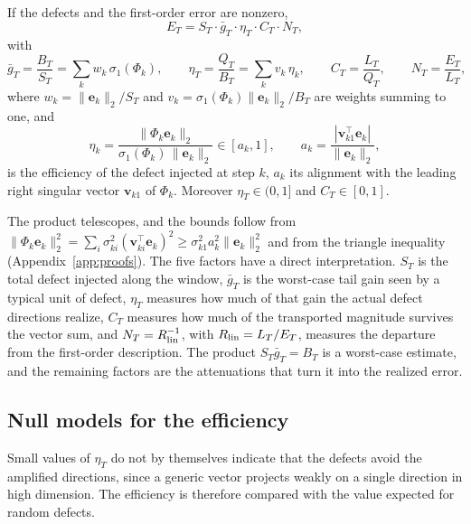 \begin{proposition}
\label{prop:factorization}
If the defects and the first-order error are nonzero,
\begin{equation}
  \boxed{\;E_T=S_T\cdot\bar g_T\cdot\eta_T\cdot C_T\cdot N_T,\;}
  \label{eq:factorization}
\end{equation}
with
\begin{equation}
  \bar g_T=\frac{B_T}{S_T}=\sum_k w_k\,\sigma_1(\Phi_k),
  \qquad
  \eta_T=\frac{Q_T}{B_T}=\sum_k v_k\,\eta_k,
  \qquad
  C_T=\frac{L_T}{Q_T},
  \qquad
  N_T=\frac{E_T}{L_T},
  \label{eq:factors}
\end{equation}
where $w_k=\|\mathbf e_k\|_2/S_T$ and $v_k=\sigma_1(\Phi_k)\|\mathbf e_k\|_2/B_T$ are weights summing to one, and
\begin{equation}
  \eta_k=\frac{\|\Phi_k\mathbf e_k\|_2}{\sigma_1(\Phi_k)\,\|\mathbf e_k\|_2}\in[a_k,1],
  \qquad
  a_k=\frac{|\mathbf v_{k1}^\top\mathbf e_k|}{\|\mathbf e_k\|_2},
  \label{eq:gain_efficiency}
\end{equation}
is the efficiency of the defect injected at step $k$, $a_k$ its alignment with the leading right singular vector $\mathbf v_{k1}$ of $\Phi_k$. Moreover $\eta_T\in(0,1]$ and $C_T\in[0,1]$.
\end{proposition}

The product telescopes, and the bounds follow from $\|\Phi_k\mathbf e_k\|_2^2=\sum_i\sigma_{ki}^2(\mathbf v_{ki}^\top\mathbf e_k)^2\ge\sigma_{k1}^2a_k^2\|\mathbf e_k\|_2^2$ and from the triangle inequality (Appendix~\ref{app:proofs}). The five factors have a direct interpretation. $S_T$ is the total defect injected along the window, $\bar g_T$ is the worst-case tail gain seen by a typical unit of defect, $\eta_T$ measures how much of that gain the actual defect directions realize, $C_T$ measures how much of the transported magnitude survives the vector sum, and $N_T=R_{\rm lin}^{-1}$, with $R_{\rm lin}=L_T/E_T$, measures the departure from the first-order description. The product $S_T\bar g_T=B_T$ is a worst-case estimate, and the remaining factors are the attenuations that turn it into the realized error.

\subsection{Null models for the efficiency}

Small values of $\eta_T$ do not by themselves indicate that the defects avoid the amplified directions, since a generic vector projects weakly on a single direction in high dimension. The efficiency is therefore compared with the value expected for random defects.

